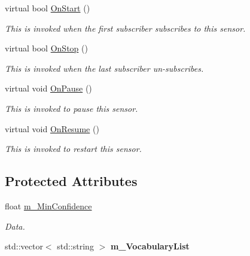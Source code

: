 \begin{DoxyCompactItemize}
\mbox{\label{class_local_speech_to_text_afc8d632674a9c5ca22066a1c760e46f5}} 
virtual bool \hyperlink{class_local_speech_to_text_afc8d632674a9c5ca22066a1c760e46f5}{On\+Start} ()
\begin{DoxyCompactList}\small\item\em This is invoked when the first subscriber subscribes to this sensor. \end{DoxyCompactList}\item 
\mbox{\label{class_local_speech_to_text_a8d5bc8dfe0494ca0581e7d0b5ba9d2e6}} 
virtual bool \hyperlink{class_local_speech_to_text_a8d5bc8dfe0494ca0581e7d0b5ba9d2e6}{On\+Stop} ()
\begin{DoxyCompactList}\small\item\em This is invoked when the last subscriber un-\/subscribes. \end{DoxyCompactList}\item 
\mbox{\label{class_local_speech_to_text_a5d99385276987d589da378cb582c44d5}} 
virtual void \hyperlink{class_local_speech_to_text_a5d99385276987d589da378cb582c44d5}{On\+Pause} ()
\begin{DoxyCompactList}\small\item\em This is invoked to pause this sensor. \end{DoxyCompactList}\item 
\mbox{\label{class_local_speech_to_text_a9b48889f99cceed10ef8dc58c759b97e}} 
virtual void \hyperlink{class_local_speech_to_text_a9b48889f99cceed10ef8dc58c759b97e}{On\+Resume} ()
\begin{DoxyCompactList}\small\item\em This is invoked to restart this sensor. \end{DoxyCompactList}\end{DoxyCompactItemize}
\subsection*{Protected Attributes}
\begin{DoxyCompactItemize}
\item 
\mbox{\label{class_local_speech_to_text_ac99d79a0b39a9f7e70c823fdccfa93b3}} 
float \hyperlink{class_local_speech_to_text_ac99d79a0b39a9f7e70c823fdccfa93b3}{m\+\_\+\+Min\+Confidence}
\begin{DoxyCompactList}\small\item\em Data. \end{DoxyCompactList}\item 
\mbox{\label{class_local_speech_to_text_ae0ebc75293ec59d4add5b5df810b1161}} 
std\+::vector$<$ std\+::string $>$ {\bfseries m\+\_\+\+Vocabulary\+List}
\end{DoxyCompactItemize}
